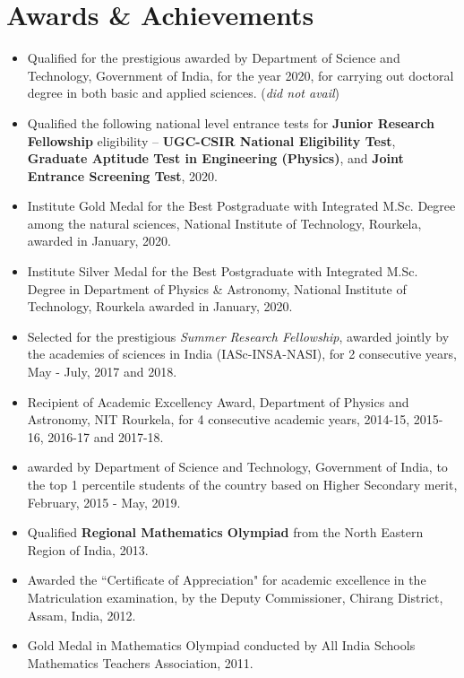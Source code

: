\documentclass[11pt, letterpaper]{article}
\let\oldhref\href
\renewcommand{\href}[3][blue]{\oldhref{#2}{\color{#1}{#3}}}
\begin{document}
	\section{Awards \& Achievements}
	\begin{itemize}
	\renewcommand{\labelitemi}{\color{blue}$\scriptstyle{\lozenge}$}
		\item Qualified for the prestigious \href{https://online-inspire.gov.in/Account/INSPIREProgramme}{INSPIRE Fellowship} awarded by Department of Science and Technology, Government of India, for the year 2020, for carrying out doctoral degree in both basic and applied sciences. (\textit{did not avail})
		
		\item Qualified the following national level entrance tests for \textbf{Junior Research Fellowship} eligibility -- \textbf{UGC-CSIR National Eligibility Test}, \textbf{Graduate Aptitude Test in Engineering (Physics)}, and \textbf{Joint Entrance Screening Test}, 2020.
				
		\item Institute Gold Medal for the Best Postgraduate with Integrated M.Sc. Degree among the natural sciences, National Institute of Technology, Rourkela, awarded in January, 2020.

		\item Institute Silver Medal for the Best Postgraduate with Integrated M.Sc. Degree in Department of Physics \& Astronomy, National Institute of Technology, Rourkela awarded in January, 2020.

		\item Selected for the prestigious \emph{Summer Research Fellowship}, awarded jointly by the academies of sciences in India (IASc-INSA-NASI), for 2 consecutive years, May - July, 2017 and 2018.

		\item Recipient of Academic Excellency Award, Department of Physics and Astronomy, NIT Rourkela, for 4 consecutive academic years, 2014-15, 2015-16, 2016-17 and 2017-18.

		\item \href{https://online-inspire.gov.in/Account/INSPIREProgramme}{INSPIRE Scholarship} awarded by Department of Science and Technology, Government of India, to the top 1 percentile students of the country based on Higher Secondary merit, February, 2015 - May, 2019.

		\item Qualified \textbf{Regional Mathematics Olympiad} from the North Eastern Region of India, 2013.

		\item Awarded the ``Certificate of Appreciation" for academic excellence in the Matriculation examination, by the Deputy Commissioner, Chirang District, Assam, India, 2012.

		\item Gold Medal in Mathematics Olympiad conducted by All India Schools Mathematics Teachers Association, 2011.
	\end{itemize}
\end{document}
